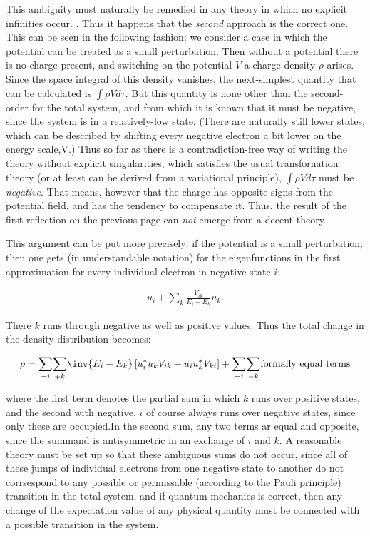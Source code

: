 \documentclass{article}
\newcommand{\uequ}[1]{
\begin{align*}
#1
\end{align*}
}
\newcommand{\sumX}[1]{\underset{#1}{\sum}}
\begin{document}
This ambiguity must naturally be remedied in any theory in which no explicit infinities occur. . Thus it happens that the \textit{second} approach is the correct one. This can be seen in the following fashion: we consider a case in which the potential can be treated as a small perturbation. Then without a potential there is no charge present, and switching on the potential $V$ a charge-density $\rho$ arises. Since the space integral of this density vanishes, the next-simplest quantity that can be calculated is $\int{\rho V {d\tau}}$. But this quantity is none other than the second-order  for the total system, and from which it is known that it must be negative, since the system is in a relatively-low state. (There are naturally still lower states, which can be described by shifting every negative electron a bit lower on the energy scale,V.) Thus so far as there is a contradiction-free way of writing the theory without explicit singularities, which satisfies the usual transfornation theory (or at least can be derived from a variational principle), $\int{\rho V{d\tau}}$ must be \textit{negative}. That means, however that the charge has opposite signs from the potential field, and has the tendency to compensate it. Thus, the result of the first reflection on the previous page can \textit{not} emerge from a decent theory.

This argument can be put more precisely: if the potential is a small perturbation, then one gets (in understandable notation) for the eigenfunctions in the first approximation for every individual electron in negative state $i$:
\uequ{
u_i + \sumX{k}{\frac{V_{ik}}{E_i - E_k}u_k}.
}
There $k$ runs through negative as well as positive values. Thus the total change in the density distribution becomes:
\uequ{
\rho = \sumX{-i}{\sumX{+k}{\inv{E_i - E_k}\left[
u^*_i u_k V_{ik} + u_i u_k^* V_{ki}\right]}} +
\sumX{-i}{\sumX{-k}{\text{formally equal terms}}}
}
where the first term denotes the partial sum in which $k$ runs over positive states, and the second with negative. $i$ of course always runs over negative states, since only these are occupied.In the second sum, any two terms ar equal and opposite, since the summand is antisymmetric in an exchange of $i$ and $k$. A reasonable theory must be set up so that these ambiguous sums do not occur, since all of these jumps of individual electrons from one negative state to another do not corrsespond to any possible or permissable (according to the Pauli principle) transition in the total system, and if quantum mechanics is correct, then any change of the expectation value of any physical quantity must be connected with a possible transition in the system.
\end{document}
